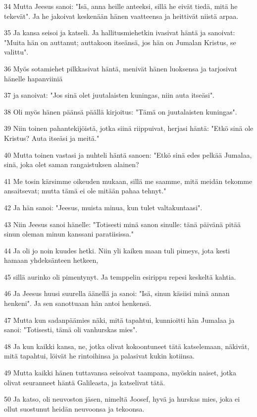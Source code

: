 \par 34 Mutta Jeesus sanoi: "Isä, anna heille anteeksi, sillä he eivät tiedä, mitä he tekevät". Ja he jakoivat keskenään hänen vaatteensa ja heittivät niistä arpaa.
\par 35 Ja kansa seisoi ja katseli. Ja hallitusmiehetkin ivasivat häntä ja sanoivat: "Muita hän on auttanut; auttakoon itseänsä, jos hän on Jumalan Kristus, se valittu".
\par 36 Myös sotamiehet pilkkasivat häntä, menivät hänen luoksensa ja tarjosivat hänelle hapanviiniä
\par 37 ja sanoivat: "Jos sinä olet juutalaisten kuningas, niin auta itseäsi".
\par 38 Oli myös hänen päänsä päällä kirjoitus: "Tämä on juutalaisten kuningas".
\par 39 Niin toinen pahantekijöistä, jotka siinä riippuivat, herjasi häntä: "Etkö sinä ole Kristus? Auta itseäsi ja meitä."
\par 40 Mutta toinen vastasi ja nuhteli häntä sanoen: "Etkö sinä edes pelkää Jumalaa, sinä, joka olet saman rangaistuksen alainen?
\par 41 Me tosin kärsimme oikeuden mukaan, sillä me saamme, mitä meidän tekomme ansaitsevat; mutta tämä ei ole mitään pahaa tehnyt."
\par 42 Ja hän sanoi: "Jeesus, muista minua, kun tulet valtakuntaasi".
\par 43 Niin Jeesus sanoi hänelle: "Totisesti minä sanon sinulle: tänä päivänä pitää sinun oleman minun kanssani paratiisissa."
\par 44 Ja oli jo noin kuudes hetki. Niin yli kaiken maan tuli pimeys, jota kesti hamaan yhdeksänteen hetkeen,
\par 45 sillä aurinko oli pimentynyt. Ja temppelin esirippu repesi keskeltä kahtia.
\par 46 Ja Jeesus huusi suurella äänellä ja sanoi: "Isä, sinun käsiisi minä annan henkeni". Ja sen sanottuaan hän antoi henkensä.
\par 47 Mutta kun sadanpäämies näki, mitä tapahtui, kunnioitti hän Jumalaa ja sanoi: "Totisesti, tämä oli vanhurskas mies".
\par 48 Ja kun kaikki kansa, ne, jotka olivat kokoontuneet tätä katselemaan, näkivät, mitä tapahtui, löivät he rintoihinsa ja palasivat kukin kotiinsa.
\par 49 Mutta kaikki hänen tuttavansa seisoivat taampana, myöskin naiset, jotka olivat seuranneet häntä Galileasta, ja katselivat tätä.
\par 50 Ja katso, oli neuvoston jäsen, nimeltä Joosef, hyvä ja hurskas mies, joka ei ollut suostunut heidän neuvoonsa ja tekoonsa.
